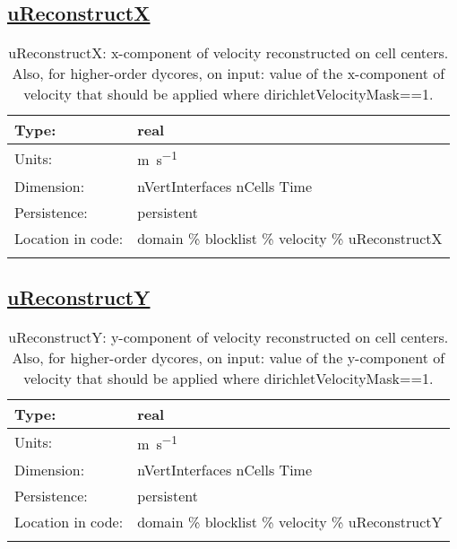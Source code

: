 \subsection[uReconstructX]{\hyperref[sec:var_tab_velocity]{uReconstructX}}
\label{subsec:var_sec_velocity_uReconstructX}
\begin{center}
\begin{longtable}{| p{2.0in} | p{4.0in} |}
        \hline 
        Type: & real \\
        \hline 
        Units: & \si{m.s^{-1}} \\
        \hline 
        Dimension: & nVertInterfaces nCells Time \\
        \hline 
        Persistence: & persistent \\
        \hline 
         Location in code: & domain \% blocklist \% velocity \% uReconstructX \\
         \hline 
    \caption{uReconstructX: x-component of velocity reconstructed on cell centers.  Also, for higher-order dycores, on input: value of the x-component of velocity that should be applied where dirichletVelocityMask==1.}
\end{longtable}
\end{center}
\subsection[uReconstructY]{\hyperref[sec:var_tab_velocity]{uReconstructY}}
\label{subsec:var_sec_velocity_uReconstructY}
\begin{center}
\begin{longtable}{| p{2.0in} | p{4.0in} |}
        \hline 
        Type: & real \\
        \hline 
        Units: & \si{m.s^{-1}} \\
        \hline 
        Dimension: & nVertInterfaces nCells Time \\
        \hline 
        Persistence: & persistent \\
        \hline 
         Location in code: & domain \% blocklist \% velocity \% uReconstructY \\
         \hline 
    \caption{uReconstructY: y-component of velocity reconstructed on cell centers.    Also, for higher-order dycores, on input: value of the y-component of velocity that should be applied where dirichletVelocityMask==1.}
\end{longtable}
\end{center}
